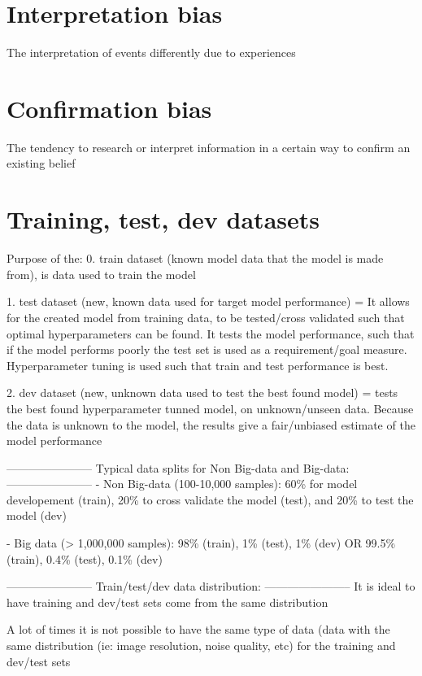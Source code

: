 \documentclass[11pt, onecolumn]{article}
\begin{document}
\section{Interpretation bias}
The interpretation of events differently due to experiences

\section{Confirmation bias}
The tendency to research or interpret information in a certain way to confirm an existing belief


\section{Training, test, dev datasets}

Purpose of the:
0. train dataset (known model data that the model is made from), is data used to train the model

1. test dataset (new, known data used for target model performance) = It allows for the created model from training data, to be tested/cross validated such that optimal hyperparameters can be found. It tests the model performance, such that if the model performs poorly the test set is used as a requirement/goal measure. Hyperparameter tuning is used such that train and test performance is best. 

2. dev dataset (new, unknown data used to test the best found model) = tests the best found hyperparameter tunned model, on unknown/unseen data. Because the data is unknown to the model, the results give a fair/unbiased estimate of the model performance



-----------------------
Typical data splits for Non Big-data and Big-data:
-----------------------
- Non Big-data (100-10,000 samples): 60\% for model developement (train), 20\% to cross validate the model (test), and 20\% to test the model (dev)

- Big data (> 1,000,000 samples):  98\% (train), 1\% (test), 1\% (dev) OR 99.5\% (train), 0.4\% (test), 0.1\% (dev)



-----------------------
Train/test/dev data distribution:
-----------------------
It is ideal to have training and dev/test sets come from the same distribution

A lot of times it is not possible to have the same type of data (data with the same distribution (ie: image resolution, noise quality, etc) for the training and dev/test sets
\end{document}

